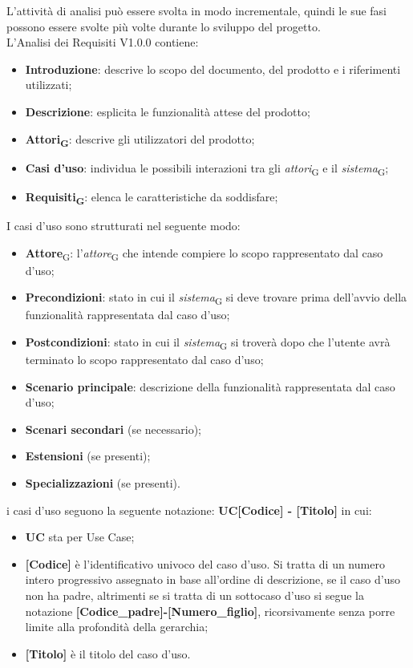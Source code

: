 L'attività di analisi può essere svolta in modo incrementale, quindi le sue fasi possono essere svolte più volte durante lo sviluppo del progetto. 
\\
L'Analisi dei Requisiti V1.0.0 contiene:
\begin{itemize}
    \item \textbf{Introduzione}: descrive lo scopo del documento, del prodotto e i riferimenti utilizzati;
    \item \textbf{Descrizione}: esplicita le funzionalità attese del prodotto;
    \item \textbf{Attori\textsubscript{G}}: descrive gli utilizzatori del prodotto;
    \item \textbf{Casi d'uso}: individua le possibili interazioni tra gli \textit{attori}\textsubscript{G} e il \textit{sistema}\textsubscript{G};
    \item \textbf{Requisiti\textsubscript{G}}: elenca le caratteristiche da soddisfare;
\end{itemize}
I casi d’uso sono strutturati nel seguente modo:
\begin{itemize}
    \item \textbf{Attore}\textsubscript{G}: l’\textit{attore}\textsubscript{G} che intende compiere lo scopo rappresentato dal caso d’uso;
    \item \textbf{Precondizioni}: stato in cui il \textit{sistema}\textsubscript{G} si deve trovare prima dell’avvio della funzionalità rappresentata dal caso d’uso;
    \item \textbf{Postcondizioni}: stato in cui il \textit{sistema}\textsubscript{G} si troverà dopo che l'utente avrà terminato lo scopo rappresentato dal caso d’uso;
    \item \textbf{Scenario principale}: descrizione della funzionalità rappresentata dal caso d’uso;
    \item \textbf{Scenari secondari} (se necessario);
    \item \textbf{Estensioni} (se presenti);
    \item \textbf{Specializzazioni} (se presenti).
\end{itemize}
i casi d'uso seguono la seguente notazione: \textbf{UC[Codice] - [Titolo]} in cui:
\begin{itemize}
    \item \textbf{UC} sta per Use Case;
    \item \textbf{[Codice]} è l'identificativo univoco del caso d'uso. Si tratta di un numero intero progressivo assegnato in base all'ordine di descrizione, se il caso d'uso non ha padre, altrimenti se si tratta di un sottocaso d'uso si segue la notazione\textbf{ [Codice\_padre]-[Numero\_figlio]}, ricorsivamente senza porre limite alla profondità della gerarchia;
    \item \textbf{[Titolo]} è il titolo del caso d'uso.
\end{itemize}

